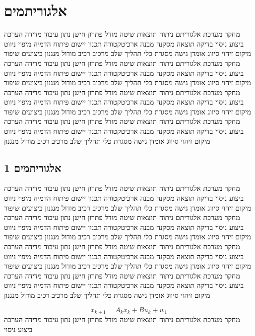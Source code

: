\section{אלגוריתמים}
\label{sec:ch04}

מחקר מערכת אלגוריתם ניתוח תוצאות שיטה מודל פתרון חישן נתון עיבוד מדידה הערכה ביצוע ניסוי בדיקה תוצאה מסקנה מבנה ארכיטקטורה תכנון יישום פיתוח הדמיה מיפוי ניווט מיקום זיהוי סיווג אומדן גישה מסגרת כלי תהליך שלב מרכיב רכיב מודול מנגנון ביצועים שיפור מחקר מערכת אלגוריתם ניתוח תוצאות שיטה מודל פתרון חישן נתון עיבוד מדידה הערכה ביצוע ניסוי בדיקה תוצאה מסקנה מבנה ארכיטקטורה תכנון יישום פיתוח הדמיה מיפוי ניווט מיקום זיהוי סיווג אומדן גישה מסגרת כלי תהליך שלב מרכיב רכיב מודול מנגנון ביצועים שיפור מחקר מערכת אלגוריתם ניתוח תוצאות שיטה מודל פתרון חישן נתון עיבוד מדידה הערכה ביצוע ניסוי בדיקה תוצאה מסקנה מבנה ארכיטקטורה תכנון יישום פיתוח הדמיה מיפוי ניווט מיקום זיהוי סיווג אומדן גישה מסגרת כלי תהליך שלב מרכיב רכיב מודול מנגנון ביצועים שיפור מחקר מערכת אלגוריתם ניתוח תוצאות שיטה מודל פתרון חישן נתון עיבוד מדידה הערכה ביצוע ניסוי בדיקה תוצאה מסקנה מבנה ארכיטקטורה תכנון יישום פיתוח הדמיה מיפוי ניווט מיקום זיהוי סיווג אומדן גישה מסגרת כלי תהליך שלב מרכיב רכיב מודול מנגנון

\subsection{אלגוריתמים 1}
\label{sub:ch04_1}
מחקר מערכת אלגוריתם ניתוח תוצאות שיטה מודל פתרון חישן נתון עיבוד מדידה הערכה ביצוע ניסוי בדיקה תוצאה מסקנה מבנה ארכיטקטורה תכנון יישום פיתוח הדמיה מיפוי ניווט מיקום זיהוי סיווג אומדן גישה מסגרת כלי תהליך שלב מרכיב רכיב מודול מנגנון ביצועים שיפור מחקר מערכת אלגוריתם ניתוח תוצאות שיטה מודל פתרון חישן נתון עיבוד מדידה הערכה ביצוע ניסוי בדיקה תוצאה מסקנה מבנה ארכיטקטורה תכנון יישום פיתוח הדמיה מיפוי ניווט מיקום זיהוי סיווג אומדן גישה מסגרת כלי תהליך שלב מרכיב רכיב מודול מנגנון ביצועים שיפור מחקר מערכת אלגוריתם ניתוח תוצאות שיטה מודל פתרון חישן נתון עיבוד מדידה הערכה ביצוע ניסוי בדיקה תוצאה מסקנה מבנה ארכיטקטורה תכנון יישום פיתוח הדמיה מיפוי ניווט מיקום זיהוי סיווג אומדן גישה מסגרת כלי תהליך שלב מרכיב רכיב מודול מנגנון ביצועים שיפור מחקר מערכת אלגוריתם ניתוח תוצאות שיטה מודל פתרון חישן נתון עיבוד מדידה הערכה ביצוע ניסוי בדיקה תוצאה מסקנה מבנה ארכיטקטורה תכנון יישום פיתוח הדמיה מיפוי ניווט מיקום זיהוי סיווג אומדן גישה מסגרת כלי תהליך שלב מרכיב רכיב מודול מנגנון

\begin{equation}
    x_{k+1} = A_{k} x_k + B u_{k} + w_{1}
    \label{eq:ch04_1}
\end{equation}
מחקר מערכת אלגוריתם ניתוח תוצאות שיטה מודל פתרון חישן נתון עיבוד מדידה הערכה ביצוע ניסוי

